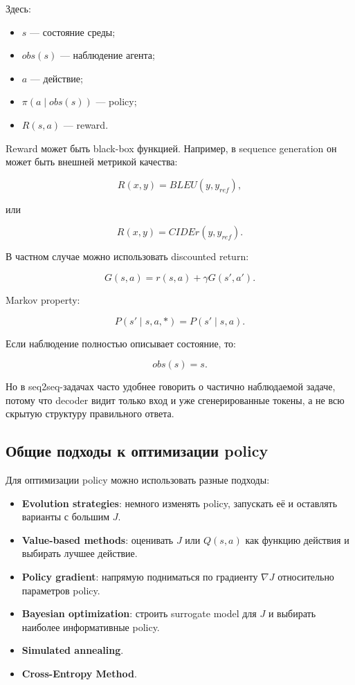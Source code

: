 \documentclass[a4paper,12pt]{article}
\begin{document}
Здесь:

\begin{itemize}
    \item \(s\) --- состояние среды;
    \item \(obs(s)\) --- наблюдение агента;
    \item \(a\) --- действие;
    \item \(\pi(a \mid obs(s))\) --- policy;
    \item \(R(s,a)\) --- reward.
\end{itemize}

Reward может быть black-box функцией. Например, в sequence generation он может быть внешней метрикой качества:

\[
R(x,y) = BLEU(y, y_{ref}),
\]

или

\[
R(x,y) = CIDEr(y, y_{ref}).
\]

В частном случае можно использовать discounted return:

\[
G(s,a)
=
r(s,a)
+
\gamma G(s',a').
\]

Markov property:

\[
P(s' \mid s,a,*) = P(s'\mid s,a).
\]

Если наблюдение полностью описывает состояние, то:

\[
obs(s)=s.
\]

Но в seq2seq-задачах часто удобнее говорить о частично наблюдаемой задаче, потому что decoder видит только вход и уже сгенерированные токены, а не всю скрытую структуру правильного ответа.

\subsection{Общие подходы к оптимизации policy}

Для оптимизации policy можно использовать разные подходы:

\begin{itemize}
    \item \textbf{Evolution strategies}: немного изменять policy, запускать её и оставлять варианты с большим \(J\).
    \item \textbf{Value-based methods}: оценивать \(J\) или \(Q(s,a)\) как функцию действия и выбирать лучшее действие.
    \item \textbf{Policy gradient}: напрямую подниматься по градиенту \(\nabla J\) относительно параметров policy.
    \item \textbf{Bayesian optimization}: строить surrogate model для \(J\) и выбирать наиболее информативные policy.
    \item \textbf{Simulated annealing}.
    \item \textbf{Cross-Entropy Method}.
\end{itemize}
\end{document}
